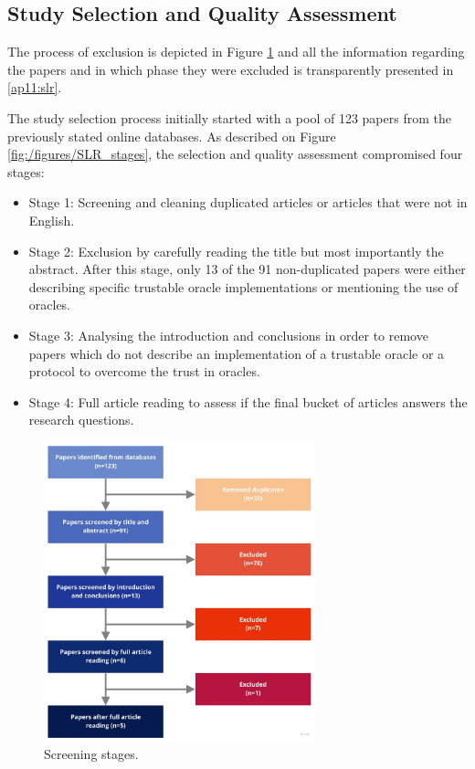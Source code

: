 \subsection{Study Selection and Quality Assessment}

The process of exclusion is depicted in Figure \ref{fig:/figures/paper-screening} and all the information regarding the papers and in which phase they were excluded is transparently presented in \ref{ap11:slr}.

The study selection process initially started with a pool of 123 papers from the previously stated online databases. As described on Figure \ref{fig:/figures/SLR_stages}, the selection and quality assessment compromised four stages:
\begin{itemize}
  \item Stage 1: Screening and cleaning duplicated articles or articles that were not in English.
  \item Stage 2: Exclusion by carefully reading the title but most importantly the abstract. After this stage, only 13 of the 91 non-duplicated papers were either describing specific trustable oracle implementations or mentioning the use of oracles.
  \item Stage 3: Analysing the introduction and conclusions in order to remove papers which do not describe an implementation of a trustable oracle or a protocol to overcome the trust in oracles.
  \item Stage 4: Full article reading to assess if the final bucket of articles answers the research questions.
\end{itemize}

\begin{figure}[H]
  \begin{center}
    \leavevmode
    \includegraphics[width=0.7\textwidth]{figures/paper-screening.jpg}
    \caption{Screening stages.}
    \label{fig:/figures/paper-screening}
  \end{center}
\end{figure}

